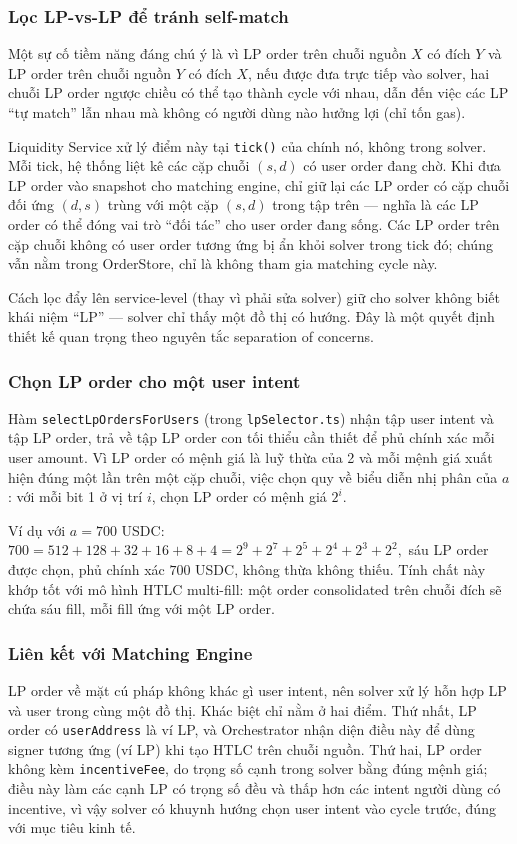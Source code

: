 \subsubsection{Lọc LP-vs-LP để tránh self-match}

Một sự cố tiềm năng đáng chú ý là vì LP order trên chuỗi nguồn $X$ có đích $Y$ và LP order trên chuỗi nguồn $Y$ có đích $X$, nếu được đưa trực tiếp vào solver, hai chuỗi LP order ngược chiều có thể tạo thành cycle với nhau, dẫn đến việc các LP ``tự match'' lẫn nhau mà không có người dùng nào hưởng lợi (chỉ tốn gas).

Liquidity Service xử lý điểm này tại \texttt{tick()} của chính nó, không trong solver. Mỗi tick, hệ thống liệt kê các cặp chuỗi $(s, d)$ có user order đang chờ. Khi đưa LP order vào snapshot cho matching engine, chỉ giữ lại các LP order có cặp chuỗi đối ứng $(d, s)$ trùng với một cặp $(s, d)$ trong tập trên — nghĩa là các LP order có thể đóng vai trò ``đối tác'' cho user order đang sống. Các LP order trên cặp chuỗi không có user order tương ứng bị ẩn khỏi solver trong tick đó; chúng vẫn nằm trong OrderStore, chỉ là không tham gia matching cycle này.

Cách lọc đẩy lên service-level (thay vì phải sửa solver) giữ cho solver không biết khái niệm ``LP'' — solver chỉ thấy một đồ thị có hướng. Đây là một quyết định thiết kế quan trọng theo nguyên tắc separation of concerns.

\subsubsection{Chọn LP order cho một user intent}

Hàm \texttt{selectLpOrdersForUsers} (trong \texttt{lpSelector.ts}) nhận tập user intent và tập LP order, trả về tập LP order con tối thiểu cần thiết để phủ chính xác mỗi user amount. Vì LP order có mệnh giá là luỹ thừa của 2 và mỗi mệnh giá xuất hiện đúng một lần trên một cặp chuỗi, việc chọn quy về biểu diễn nhị phân của $a$: với mỗi bit 1 ở vị trí $i$, chọn LP order có mệnh giá $2^i$.

Ví dụ với $a = 700$ USDC:
$
700 = 512 + 128 + 32 + 16 + 8 + 4 = 2^9 + 2^7 + 2^5 + 2^4 + 2^3 + 2^2,
$
sáu LP order được chọn, phủ chính xác $700$ USDC, không thừa không thiếu. Tính chất này khớp tốt với mô hình HTLC multi-fill: một order consolidated trên chuỗi đích sẽ chứa sáu fill, mỗi fill ứng với một LP order.

\subsubsection{Liên kết với Matching Engine}

LP order về mặt cú pháp không khác gì user intent, nên solver xử lý hỗn hợp LP và user trong cùng một đồ thị. Khác biệt chỉ nằm ở hai điểm. Thứ nhất, LP order có \texttt{userAddress} là ví LP, và Orchestrator nhận diện điều này để dùng signer tương ứng (ví LP) khi tạo HTLC trên chuỗi nguồn. Thứ hai, LP order không kèm \texttt{incentiveFee}, do trọng số cạnh trong solver bằng đúng mệnh giá; điều này làm các cạnh LP có trọng số đều và thấp hơn các intent người dùng có incentive, vì vậy solver có khuynh hướng chọn user intent vào cycle trước, đúng với mục tiêu kinh tế.
